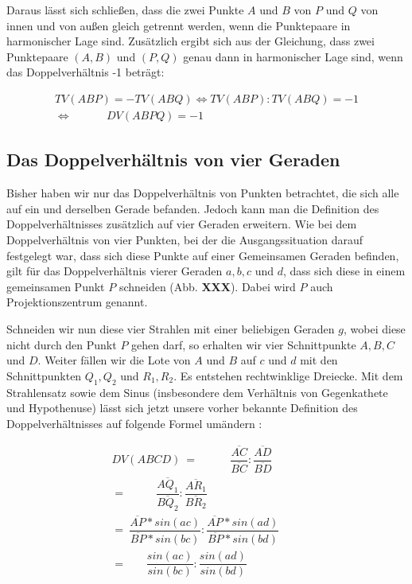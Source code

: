 \documentclass[12pt,a4paper]{article}
\begin{document}
Daraus lässt sich schließen, dass die zwei Punkte $A$ und $B$ von $P$ und $Q$ von innen und von außen gleich getrennt werden, wenn die Punktepaare in harmonischer Lage sind. Zusätzlich ergibt sich aus der Gleichung, dass zwei Punktepaare $(A, B)$ und $(P, Q)$ genau dann in harmonischer Lage sind, wenn das Doppelverhältnis -1 beträgt:

\begin{equation*}
\begin{split}
TV(A B P) = -TV(A B Q) \Longleftrightarrow TV(A B P) : TV(A B Q) = -1 \\ \Longleftrightarrow ~~~~~~~~~~~~~~DV(A B P Q) = -1
\end{split}
\end{equation*}

\subsection{Das Doppelverhältnis von vier Geraden}

Bisher haben wir nur das Doppelverhältnis von Punkten betrachtet, die sich alle auf ein und derselben Gerade befanden. Jedoch kann man die Definition des Doppelverhältnisses zusätzlich auf vier Geraden erweitern. Wie bei dem Doppelverhältnis von vier Punkten, bei der die Ausgangssituation darauf festgelegt war, dass sich diese Punkte auf einer Gemeinsamen Geraden befinden, gilt für das Doppelverhältnis vierer Geraden $a, b, c$ und $d$, dass sich diese in einem gemeinsamen Punkt $P$ schneiden (Abb. \textbf{XXX}). Dabei wird $P$ auch Projektionszentrum genannt.

Schneiden wir nun diese vier Strahlen mit einer beliebigen Geraden $g$, wobei diese nicht durch den Punkt $P$ gehen darf, so erhalten wir vier Schnittpunkte $A, B, C$ und $D$. Weiter fällen wir die Lote von $A$ und $B$ auf $c$ und $d$ mit den Schnittpunkten $Q_1, Q_2$ und $R_1, R_2$. Es entstehen rechtwinklige Dreiecke. Mit dem Strahlensatz sowie dem Sinus (insbesondere dem Verhältnis von Gegenkathete und Hypothenuse) lässt sich jetzt unsere vorher bekannte Definition des Doppelverhältnisses auf folgende Formel umändern \citep[s.~][S.~80]{projektiveGeometrie}: 

\begin{equation*}
\begin{split}
DV(A B C D)~=~~~~~~~~~~~~~\dfrac{\overline{A C}}{\overline{B C}} : \dfrac{\overline{A D}}{\overline{B D}}~~~~~~~~~~~~\\
=~~~~~~~~~~~~\dfrac{\overline{A Q_1}}{\overline{B Q_2}} : \dfrac{\overline{A R_1}}{\overline{B R_2}}~~~~~~~~~~~\\
=~\dfrac{\overline{A P} * sin(ac)}{\overline{B P} * sin(bc)} : \dfrac{\overline{A P} * sin(ad)}{\overline{B P} * sin(bd)} \\
=~~~~~~~~\dfrac{sin(ac)}{sin(bc)} : \dfrac{sin(ad)}{sin(bd)}~~~~~~~~
\end{split}
\end{equation*}
\end{document}
